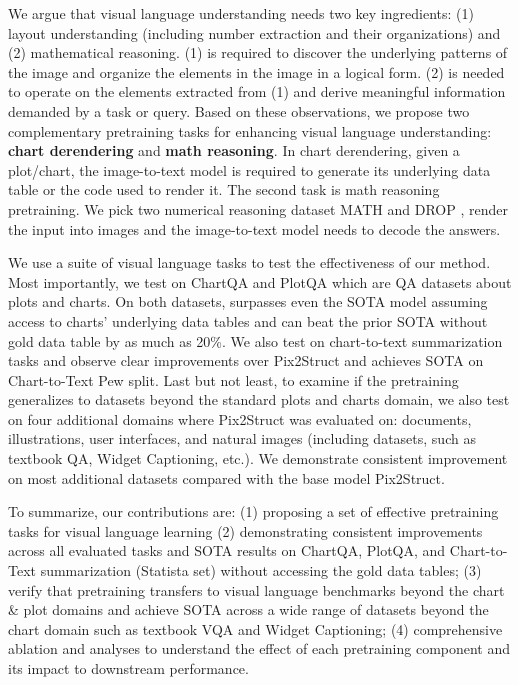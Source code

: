 We argue that visual language understanding needs two key ingredients: (1) layout understanding (including number extraction and their organizations) and (2) mathematical reasoning. (1) is required to discover the underlying patterns of the image and organize the elements in the image in a logical form. (2) is needed to operate on the elements extracted from (1) and derive meaningful information demanded by a task or query. Based on these observations, we propose two complementary pretraining tasks for enhancing visual language understanding: \textbf{chart derendering} and \textbf{math reasoning}. In chart derendering, given a plot/chart, the image-to-text model is required to generate its underlying data table or the code used to render it. The second task is math reasoning pretraining. We pick two numerical reasoning dataset MATH \citep{saxton2019analysing} and DROP \citep{dua-etal-2019-drop}, render the input into images and the image-to-text model needs to decode the answers.


We use a suite of visual language tasks to test the effectiveness of our method. Most importantly, we test on ChartQA and PlotQA which are QA datasets about plots and charts. On both datasets, \model{} surpasses even the SOTA model assuming access to charts' underlying data tables and can beat the prior SOTA without gold data table by as much as 20\%. We also test \model{} on chart-to-text summarization tasks and observe clear improvements over Pix2Struct and achieves SOTA on Chart-to-Text \citep{kantharaj-etal-2022-chart} Pew split. Last but not least, to examine if the \model{} pretraining generalizes to datasets beyond the standard plots and charts domain, we also test \model{} on four additional domains where Pix2Struct was evaluated on: documents, illustrations, user
interfaces, and natural images (including datasets, such as textbook QA, Widget Captioning, etc.).
We demonstrate consistent improvement on most additional datasets compared with the base model Pix2Struct. 

To summarize, our contributions are: (1) proposing a set of effective pretraining tasks for visual language learning (2) demonstrating consistent improvements across all evaluated tasks and SOTA results on ChartQA, PlotQA, and Chart-to-Text summarization (Statista set) without accessing the gold data tables; (3) verify that \model{} pretraining transfers to visual language benchmarks beyond the chart \& plot domains and achieve SOTA across a wide range of datasets beyond the chart domain such as textbook VQA and Widget Captioning; (4) comprehensive ablation and analyses to understand the effect of each pretraining component and its impact to downstream performance.
